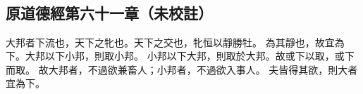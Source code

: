 ﻿%
%

\chapter{~}

\section{原道德經第六十一章（未校註）}

\begin{withgezhu}

\zhsong


\textcolor{tongjia-color}{大邦者下流也}，天下之牝也。天下之交也，牝恒以靜勝牡。
為其靜也，故宜為下。\textcolor{tongjia-color}{大邦以下小邦}，則取小邦。
小邦以下大邦，則取於大邦。故或下以取，或下而取。
故大邦者，不過欲兼畜人；小邦者，不過欲入事人。
夫皆得其欲，則大者宜為下。

\end{withgezhu}
